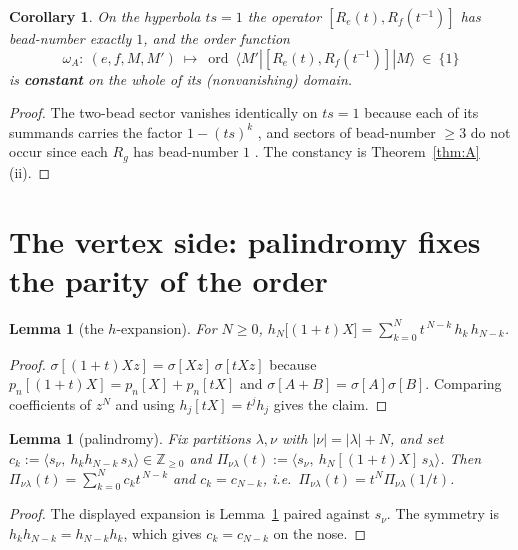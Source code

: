 \documentclass[11pt]{article}
\newtheorem{lemma}[theorem]{Lemma}
\newtheorem{corollary}[theorem]{Corollary}
\theoremstyle{definition}
\newcommand{\Z}{\mathbb{Z}}
\newcommand{\ord}{\operatorname{ord}}
\begin{document}
\begin{corollary}\label{cor:Aorder}
On the hyperbola $ts=1$ the operator $[R_e(t),R_f(t^{-1})]$ has bead-number exactly $1$,
and the order function
\[
  \omega_A:\ (e,f,M,M')\ \longmapsto\ \ord\ \langle M'|[R_e(t),R_f(t^{-1})]|M\rangle
  \ \in\ \{1\}
\]
is \textbf{constant} on the whole of its (nonvanishing) domain.
\end{corollary}

\begin{proof}
The two-bead sector vanishes identically on $ts=1$ because each of its summands carries the
factor $1-(ts)^{k}$ \cite[Thm.~4.1(2), Cor.~4.2(iii)]{Q96}, and sectors of bead-number
$\ge3$ do not occur since each $R_g$ has bead-number $1$ \cite[Conv.~2.1]{Q92}.  The
constancy is Theorem~\ref{thm:A}(ii).
\end{proof}

\section{The vertex side: palindromy fixes the parity of the order}

\begin{lemma}[the $h$-expansion]\label{lem:hexp}
For $N\ge0$, \quad $h_N\bigl[(1+t)X\bigr]=\sum_{k=0}^{N}t^{\,N-k}\,h_k\,h_{N-k}$.
\end{lemma}

\begin{proof}
$\sigma[(1+t)Xz]=\sigma[Xz]\,\sigma[tXz]$ because $p_n[(1+t)X]=p_n[X]+p_n[tX]$ and
$\sigma[A+B]=\sigma[A]\sigma[B]$.  Comparing coefficients of $z^N$ and using
$h_j[tX]=t^{j}h_j$ gives the claim.
\end{proof}

\begin{lemma}[palindromy]\label{lem:palin}
Fix partitions $\lambda,\nu$ with $|\nu|=|\lambda|+N$, and set
$c_k:=\bigl\langle s_\nu,\ h_kh_{N-k}\,s_\lambda\bigr\rangle\in\Z_{\ge0}$ and
$\Pi_{\nu\lambda}(t):=\bigl\langle s_\nu,\ h_N[(1+t)X]\,s_\lambda\bigr\rangle$.
Then $\Pi_{\nu\lambda}(t)=\sum_{k=0}^{N}c_kt^{\,N-k}$ and $c_k=c_{N-k}$, i.e.\
$\Pi_{\nu\lambda}(t)=t^{N}\Pi_{\nu\lambda}(1/t)$.
\end{lemma}

\begin{proof}
The displayed expansion is Lemma~\ref{lem:hexp} paired against $s_\nu$.  The symmetry is
$h_kh_{N-k}=h_{N-k}h_k$, which gives $c_k=c_{N-k}$ on the nose.
\end{proof}
\end{document}
